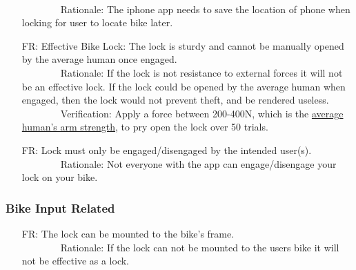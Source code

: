 \documentclass[12pt]{article}
\newcounter{reqnum} %
\begin{document}
\begin{itemize}
\\ \-\ \-\ \-\ \-\ \-\ \-\ \-\ \-\ Rationale: The iphone app needs to save the location of phone when locking for user to locate bike later.
\item[FR\refstepcounter{reqnum}\thereqnum\label{FR8}:] Effective Bike Lock: The lock is sturdy and cannot be manually opened by the average human once engaged.
\\ \-\ \-\ \-\ \-\ \-\ \-\ \-\ \-\ Rationale: If the lock is not resistance to external forces it will not be an effective lock. If the lock could be opened by the average human when engaged, then the lock would not prevent theft, and be rendered useless.
\\ \-\ \-\ \-\ \-\ \-\ \-\ \-\ \-\ Verification: Apply a force between 200-400N, which is the \href{https://www.tandfonline.com/doi/pdf/10.1080/10803548.2004.11076594?cookieSet=1}{average human's arm strength}, to pry open the lock over 50 trials. 
\item[FR\refstepcounter{reqnum}\thereqnum\label{FR9}:] Lock must only be engaged/disengaged by the intended user(s).
\\ \-\ \-\ \-\ \-\ \-\ \-\ \-\ \-\ Rationale: Not everyone with the app can engage/disengage your lock on your bike.
\end{itemize}

\subsubsection{Bike Input Related}
\begin{itemize}
\setlength{\itemindent}{.5in}
\item[FR\refstepcounter{reqnum}\thereqnum\label{FR10}:] The lock can be mounted to the bike's frame.
\\ \-\ \-\ \-\ \-\ \-\ \-\ \-\ \-\ Rationale: If the lock can not be mounted to the users bike it will not be effective as a lock.
\end{itemize}
\end{document}
